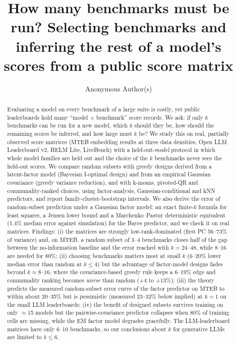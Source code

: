 \documentclass{article}
\title{How many benchmarks must be run? Selecting benchmarks and inferring the rest of a model's scores from a public score matrix}
\author{Anonymous Author(s)}
\begin{document}
\maketitle

\begin{abstract}
Evaluating a model on every benchmark of a large suite is costly, yet public leaderboards hold many ``model $\times$ benchmark'' score records. We ask: if only $k$ benchmarks can be run for a new model, which $k$ should they be, how should the remaining scores be inferred, and how large must $k$ be? We study this on real, partially observed score matrices (MTEB embedding results at three data densities, Open LLM Leaderboard v2, HELM Lite, LiveBench) with a held-out-\emph{model} protocol in which whole model families are held out and the choice of the $k$ benchmarks never sees the held-out scores. We compare random subsets with greedy designs derived from a latent-factor model (Bayesian I-optimal design) and from an empirical Gaussian covariance (greedy variance reduction), and with k-means, pivoted-QR and communality-ranked choices, using factor-analysis, Gaussian-conditional and kNN predictors, and report family-cluster-bootstrap intervals. We also derive the error of random-subset prediction under a Gaussian factor model: an exact finite-$k$ formula for least squares, a Jensen lower bound and a Marchenko--Pastur deterministic equivalent (1.4\% median error against simulation) for the Bayes predictor, and we check it on real matrices. Findings: (i) the matrices are strongly low-rank-dominated (first PC 56--73\% of variance) and, on MTEB, a random subset of 3--4 benchmarks closes half of the gap between the no-information baseline and the error reached with $k=24$--$48$, while 8--16 are needed for 80\%; (ii) choosing benchmarks matters most at small $k$ (6--20\% lower median error than random at $k\le4$) but the advantage of factor-model designs fades beyond $k\approx8$--$16$, where the covariance-based greedy rule keeps a 6--19\% edge and communality ranking becomes \emph{worse} than random (+4 to +13\%); (iii) the theory predicts the measured random-subset error curve of the factor predictor on MTEB to within about 20--35\% but is pessimistic (measured 23--32\% below implied) at $k=1$ on the small LLM leaderboards; (iv) the benefit of designed subsets survives training on only $\approx$15 models but the pairwise-covariance predictor collapses when 80\% of training cells are missing, while the EM factor model degrades gracefully. The LLM-leaderboard matrices have only 6--10 benchmarks, so our conclusions about $k$ for generative LLMs are limited to $k\le6$.
\end{abstract}
\end{document}
